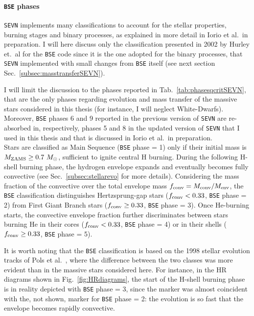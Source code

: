 \documentclass[a4paper,titlepage]{book}     	%
\newcommand{\sun}{\ensuremath{_\odot}}
\newcommand{\mzams}{M_\textup{ZAMS}}
\newcommand{\msun}{\ensuremath{M\sun}}
\begin{document}
\paragraph{\texttt{BSE} phases} \texttt{SEVN} implements many classifications to account for the stellar properties, burning stages and binary processes, as explained in more detail in Iorio et al.\ in preparation. I will here discuss only the classification presented in 2002 by Hurley et.\ al \cite{Hurley2002} for the \texttt{BSE} code since it is the one adopted for the binary processes, that \texttt{SEVN} implemented with small changes from \texttt{BSE} itself (see next section Sec.\ \ref{subsec:masstransferSEVN}). 

I will limit the discussion to the phases reported in Tab.\ \ref{tab:phasesqcritSEVN}, that are the only phases regarding evolution and mass transfer of the massive stars considered in this thesis (for instance, I will neglect White-Dwarfs). Moreover, \texttt{BSE} phases 6 and 9 reported in the previous version of \texttt{SEVN} \cite{spera2019_mergingBBH} are re-absorbed in, respectively, phases 5 and 8 in the updated version of \texttt{SEVN} that I used in this thesis and that is discussed in Iorio et al.\ in preparation.\\ 

Stars are classified as Main Sequence (\texttt{BSE} phase = 1) only if their initial mass is $\mzams \geq 0.7~\msun$, sufficient to ignite central H burning. During the following H-shell burning phase, the hydrogen envelope expands and eventually becomes fully convective (see Sec.\ \ref{subsec:stellarevo} for more details). Considering the mass fraction of the convective over the total envelope mass $f_{\rm conv}= M_{\rm conv}/M_{\rm env}$, the \texttt{BSE} classification distinguishes Hertzsprung-gap stars ($f_{\rm conv} < 0.33$, \texttt{BSE} phase = 2) from First Giant Branch stars ($f_{\rm conv} \geq 0.33$, \texttt{BSE} phase = 3).  Once He-burning starts, the convective envelope fraction further discriminates between stars burning He in their cores ($f_{\rm conv} < 0.33$, \texttt{BSE} phase = 4) or in their shells ($f_{\rm conv} \geq 0.33$, \texttt{BSE} phase = 5).

It is worth noting that the \texttt{BSE} classification is based on the 1998 stellar evolution tracks of Pols et al.\ \cite{Pols1998evotracks}, where the difference between the two classes was more evident than in the massive stars considered here. For instance, in the HR diagrams shown in Fig.\ \ref{fig:HRdiagrams}, the start of the H-shell burning phase is in reality depicted with \texttt{BSE} phase = 3, since the marker was almost coincident with the, not shown, marker for \texttt{BSE} phase = 2: the evolution is so fast that the envelope becomes rapidly convective. \\
\end{document}
